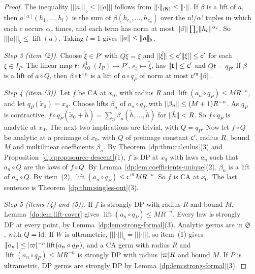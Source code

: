 \begin{proof}
The inequality $\lvert\!\lvert\!\lvert a\rvert\!\rvert\!\rvert_\flat\le\lvert\!\lvert\!\lvert a\rvert\!\rvert\!\rvert$ follows from $\lVert \cdot\rVert_{(\mathsf N)}\le\lVert \cdot\rVert$. If $\beta$ is a lift of $a$, then $a^{[\alpha]}(h_1,\dots,h_l)$ is the sum of $\beta(h_{c_1},\dots,h_{c_n})$ over the $n!/\alpha!$ tuples in which each $c$ occurs $\alpha_c$ times, and each term has norm at most $\lVert \beta\rVert\prod_c\lVert h_c\rVert^{\alpha_c}$. So $\lvert\!\lvert\!\lvert a\rvert\!\rvert\!\rvert_\flat\le\operatorname{lift}(a)$. Taking $l=1$ gives $\lVert a\rVert\le\lvert\!\lvert\!\lvert a\rvert\!\rvert\!\rvert_\flat$.

\emph{Step 3 (item (2)).} Choose $\tilde\xi\in P'$ with $Q\tilde\xi=\xi$ and $\lVert \tilde\xi\rVert\le\mathsf c'\lVert \xi\rVert\le\mathsf c'$ for each $\xi\in I_P$. The linear map $\mathsf t\colon\ell^1_{00}(I_P)\to P'$, $e_\xi\mapsto\tilde\xi$, has $\lVert \mathsf t\rVert\le\mathsf c'$ and $Q\mathsf t=q_P$. If $\beta$ is a lift of $a\circ Q$, then $\beta\circ\mathsf t^{\times n}$ is a lift of $a\circ q_P$ of norm at most $\mathsf c'^n\lVert \beta\rVert$.

\emph{Step 4 (item (3)).} Let $f$ be CA at $x_0$, with radius $R$ and $\operatorname{lift}(a_n\circ q_P)\le MR^{-n}$, and let $q_P(\tilde x_0)=x_0$. Choose lifts $\beta_n$ of $a_n\circ q_P$ with $\lVert \beta_n\rVert\le(M+1)R^{-n}$. As $q_P$ is contractive, $f\circ q_P(\tilde x_0+\tilde h)=\sum_n\beta_n(\tilde h,\dots,\tilde h)$ for $\lVert \tilde h\rVert<R$. So $f\circ q_P$ is analytic at $\tilde x_0$. The next two implications are trivial, with $Q=q_P$. Now let $f\circ Q$ be analytic at a preimage of $x_0$, with $Q$ of preimage constant $\mathsf c'$, radius $R$, bound $M$ and multilinear coefficients $\beta_n$. By Theorem~\ref{dp:thm:calculus}(3) and Proposition~\ref{dp:prop:source-descent}(1), $f$ is DP at $x_0$ with laws $a_n$ such that $a_n\circ Q$ are the laws of $f\circ Q$. By Lemma~\ref{dp:lem:coefficients-unique}(2), $\beta_n$ is a lift of $a_n\circ Q$. By item~(2), $\operatorname{lift}(a_n\circ q_P)\le\mathsf c'^nMR^{-n}$. So $f$ is CA at $x_0$. The last sentence is Theorem~\ref{dp:thm:singles-out}(3).

\emph{Step 5 (items (4) and (5)).} If $f$ is strongly DP with radius $R$ and bound $M$, Lemma~\ref{dp:lem:lift-cover} gives $\operatorname{lift}(a_n\circ q_P)\le MR^{-n}$. Every law is strongly DP at every point, by Lemma~\ref{dp:lem:strong-formal}(3). Analytic germs are in $\mathfrak S$, with $Q=\mathrm{id}$. If $W$ is ultrametric, $\lvert\!\lvert\!\lvert\cdot\rvert\!\rvert\!\rvert_\flat=\lvert\!\lvert\!\lvert\cdot\rvert\!\rvert\!\rvert$, so item~(1) gives $\lvert\!\lvert\!\lvert a_n\rvert\!\rvert\!\rvert\le\lvert \varpi\rvert^{-n}\operatorname{lift}(a_n\circ q_P)$, and a CA germ with radius $R$ and $\operatorname{lift}(a_n\circ q_P)\le MR^{-n}$ is strongly DP with radius $\lvert \varpi\rvert R$ and bound $M$. If $P$ is ultrametric, DP germs are strongly DP by Lemma~\ref{dp:lem:strong-formal}(3).


\end{proof}
